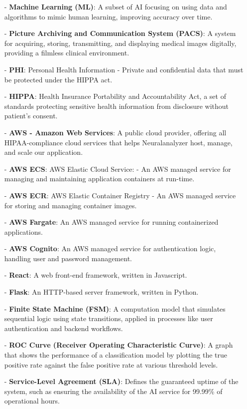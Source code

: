 \documentclass[12pt]{article}
\begin{document}
\begin{itemize}
    \item[-] \textbf{Machine Learning (ML)}: A subset of AI focusing on using data and algorithms to mimic human learning, improving accuracy over time.
    \item[-] \textbf{Picture Archiving and Communication System (PACS)}: A system for acquiring, storing, transmitting, and displaying medical images digitally, providing a filmless clinical environment.
    \item[-] \textbf{PHI}: Personal Health Information - Private and confidential data that must be protected under the HIPPA act.
    \item[-] \textbf{HIPPA}: Health Insurance Portability and Accountability Act, a set of standards protecting sensitive health information from disclosure without patient's consent.
    \item[-] \textbf{AWS - Amazon Web Services}: A public cloud provider, offering all HIPAA-compliance cloud services that helps Neuralanalyzer host, manage, and scale our application.
    \item[-] \textbf{AWS ECS}: AWS Elastic Cloud Service: - An AWS managed service for managing and maintaining application containers at run-time.
    \item[-] \textbf{AWS ECR}: AWS Elastic Container Registry - An AWS managed service for storing and managing container images.
    \item[-] \textbf{AWS Fargate}: An AWS managed service for running containerized applications.
    \item[-] \textbf{AWS Cognito}: An AWS managed service for authentication logic, handling user and password management.
    \item[-] \textbf{React}: A web front-end framework, written in Javascript.
    \item[-] \textbf{Flask}: An HTTP-based server framework, written in Python.
    \item[-] \textbf{Finite State Machine (FSM)}: A computation model that simulates sequential logic using state transitions, applied in processes like user authentication and backend workflows.
    
    \item[-] \textbf{ROC Curve (Receiver Operating Characteristic Curve)}: A graph that shows the performance of a classification model by plotting the true positive rate against the false positive rate at various threshold levels.
    
    \item[-] \textbf{Service-Level Agreement (SLA)}: Defines the guaranteed uptime of the system, such as ensuring the availability of the AI service for 99.99\% of operational hours.
    

\end{itemize}
\end{document}
